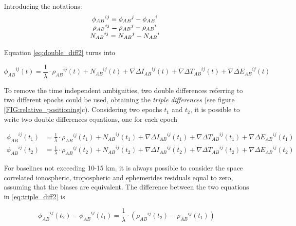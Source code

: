 Introducing the notations:
\begin{equation} 
	\begin{matrix} 
		{\phi_{AB}}^{ij}={\phi_{AB}}^{j}-{\phi_{AB}}^{i}\\ {\rho_{AB}}^{ij}={\rho_{AB}}^{j}-{\rho_{AB}}^{i}\\{N_{AB}}^{ij}={N_{AB}}^{j}-{N_{AB}}^{i}\end{matrix}
	\\
	\label{eq:notation2}
\end{equation}

Equation \ref{eq:double_diff2} turns into

\begin{equation}
	{\phi_{AB}}^{ij}(t)=\frac{1}{\lambda}\cdot {\rho_{AB}}^{ij}(t)+{N_{AB}}^{ij}(t)+ \nabla\Delta{I_{AB}}^{ij}(t)  + \nabla \Delta {T_{AB}}^{ij}(t)+\nabla \Delta {E_{AB}}^{ij}(t)
	\label{eq:triple_diff0}
\end{equation}

To remove the time independent ambiguities, two double differences referring to two different epochs could be used, obtaining the \textit{triple differences} (see figure \ref{FIG:relative_positioning}c). Considering two epochs $t_{1}$ and $t_{2}$, it is possible to write two double differences equations, one for each epoch

\begin{equation} 
	\begin{split} 
		{\phi_{AB}}^{ij}(t_{1})&=\frac{1}{\lambda}\cdot {\rho_{AB}}^{ij}(t_{1})+{N_{AB}}^{ij}(t_{1})+\nabla\Delta {I_{AB}}^{ij}(t_{1})+\nabla\Delta{T_{AB}}^{ij}(t_{1})+\nabla\Delta{E_{AB}}^{ij}(t_{1})\\ {\phi_{AB}}^{ij}(t_{2})&=\frac{1}{\lambda}\cdot {\rho_{AB}}^{ij}(t_{2})+{N_{AB}}^{ij}(t_{2})+\nabla\Delta {I_{AB}}^{ij}(t_{2})+\nabla\Delta{T_{AB}}^{ij}(t_{2})+\nabla\Delta{E_{AB}}^{ij}(t_{2})
		\label{eq:triple_diff1}
	\end{split}
\end{equation}

For baselines not exceeding 10-15 km, it is always possible to consider the space correlated ionospheric, tropospheric and ephemerides residuals equal to zero, assuming that the biases are equivalent. The difference between the two equations in \ref{eq:triple_diff2} is

\begin{equation} 
	{\phi_{AB}}^{ij}(t_{2})-{\phi_{AB}}^{ij}(t_{1})=\frac{1}{\lambda}\cdot \left({\rho_{AB}}^{ij}(t_{2})-{\rho_{AB}}^{ij}(t_{1})\right)
	\label{eq:triple_diff2}
\end{equation}

